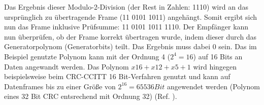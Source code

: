Das Ergebnis dieser Modulo-2-Division (der Rest in Zahlen: 1110) wird an das
urspr{\"u}nglich zu {\"u}bertragende Frame (11 0101 1011) angeh{\"a}ngt. Somit ergibt sich
nun das Frame inklusive Pr{\"u}fsumme: 11 0101 1011 1110. Der
Empf{\"a}nger kann nun {\"u}berpr{\"u}fen, ob der Frame korrekt {\"u}bertragen
wurde, indem dieser durch das Generatorpolynom (Generatorbits) teilt. Das
Ergebnis muss dabei 0 sein. Das im Beispiel genutzte Polynom kann mit der Ordnung 4
($2^4=16$) auf 16 Bits an Daten angewandt werden. Das Polynom $x16+x12+x5+1$
wird hingegen beispielsweise beim CRC-CCITT 16 Bit-Verfahren genutzt und
kann auf Datenframes bis zu einer Gr{\"o}{\ss}e von $2^{16}=65536 Bit$
angewendet werden (Polynom eines 32 Bit CRC entsrechend mit Ordnung 32) (Ref. \cite{web2}).

